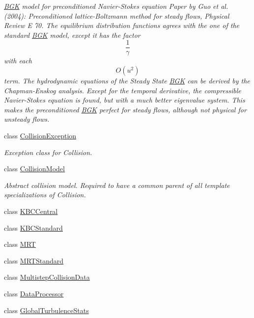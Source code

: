 \begin{DoxyCompactItemize}
\begin{DoxyCompactList}\small\item\em \hyperlink{classnatrium_1_1BGK}{BGK} model for preconditioned Navier-\/Stokes equation Paper by Guo et al. (2004): Preconditioned lattice-\/Boltzmann method for steady flows, Physical Review E 70. The equilibrium distribution functions agrees with the one of the standard \hyperlink{classnatrium_1_1BGK}{BGK} model, except it has the factor \[\frac{1}{\gamma}\] with each \[ O(u^2) \] term. The hydrodynamic equations of the Steady State \hyperlink{classnatrium_1_1BGK}{BGK} can be derived by the Chapman-\/Enskog analysis. Except for the temporal derivative, the compressible Navier-\/Stokes equation is found, but with a much better eigenvalue system. This makes the preconditioned \hyperlink{classnatrium_1_1BGK}{BGK} perfect for steady flows, although not physical for unsteady flows. \item\end{DoxyCompactList}\item 
class \hyperlink{classnatrium_1_1CollisionException}{CollisionException}
\begin{DoxyCompactList}\small\item\em Exception class for Collision. \item\end{DoxyCompactList}\item 
class \hyperlink{classnatrium_1_1CollisionModel}{CollisionModel}
\begin{DoxyCompactList}\small\item\em Abstract collision model. Required to have a common parent of all template specializations of Collision. \item\end{DoxyCompactList}\item 
class \hyperlink{classnatrium_1_1KBCCentral}{KBCCentral}
\item 
class \hyperlink{classnatrium_1_1KBCStandard}{KBCStandard}
\item 
class \hyperlink{classnatrium_1_1MRT}{MRT}
\item 
class \hyperlink{classnatrium_1_1MRTStandard}{MRTStandard}
\item 
class \hyperlink{classnatrium_1_1MultistepCollisionData}{MultistepCollisionData}
\item 
class \hyperlink{classnatrium_1_1DataProcessor}{DataProcessor}
\item 
class \hyperlink{classnatrium_1_1GlobalTurbulenceStats}{GlobalTurbulenceStats}
\item 

\end{DoxyCompactItemize}
